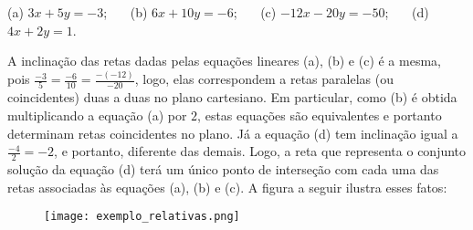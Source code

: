 \begin{center}
(a) $3x + 5y = -3$; \ \ \       (b) $6x +10y = -6$; \ \   \       (c) $-12x -20y = -50$; \ \ \     (d) $4x + 2y = 1$.
\end{center}

A inclinação das retas dadas pelas equações lineares (a), (b) e (c) é a mesma, pois $\frac{-3}{5}=\frac{-6}{10}=\frac{-(-12)}{-20}$, logo, elas correspondem a retas paralelas (ou coincidentes) duas a duas no plano cartesiano. Em particular, como (b) é obtida multiplicando a equação (a) por $2$, estas equações são equivalentes e portanto determinam retas coincidentes no plano. Já a equação (d) tem inclinação igual a $\frac{-4}{2}=-2$, e portanto, diferente das demais. Logo, a reta que representa o conjunto solução da equação (d) terá um único ponto de interseção com cada uma das retas associadas às equações (a), (b) e (c). A figura a seguir ilustra esses fatos:

\begin{figure}[H]
\centering

\noindent\texttt{[image: exemplo\_relativas.png]}
\end{figure}

